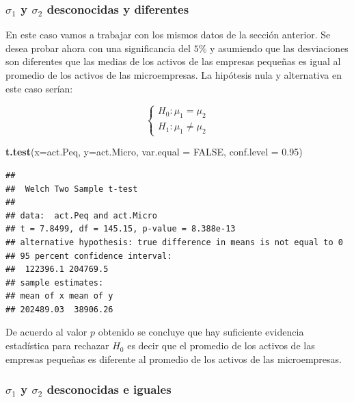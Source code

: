 \documentclass[letterpaper,]{book}
\newenvironment{Shaded}{\begin{snugshade}}{\end{snugshade}}
\newcommand{\DataTypeTok}[1]{\textcolor[rgb]{0.13,0.29,0.53}{#1}}
\newcommand{\FloatTok}[1]{\textcolor[rgb]{0.00,0.00,0.81}{#1}}
\newcommand{\KeywordTok}[1]{\textcolor[rgb]{0.13,0.29,0.53}{\textbf{#1}}}
\newcommand{\NormalTok}[1]{#1}
\newcommand{\OtherTok}[1]{\textcolor[rgb]{0.56,0.35,0.01}{#1}}
\begin{document}
\hypertarget{sigma_1-y-sigma_2-desconocidas-y-diferentes}{%
\subsubsection{\texorpdfstring{\(\sigma_1\) y \(\sigma_2\) desconocidas y diferentes}{\textbackslash{}sigma\_1 y \textbackslash{}sigma\_2 desconocidas y diferentes}}\label{sigma_1-y-sigma_2-desconocidas-y-diferentes}}

En este caso vamos a trabajar con los mismos datos de la sección anterior. Se desea probar ahora con una significancia del \(5\%\) y asumiendo que las desviaciones son diferentes que las medias de los activos de las empresas pequeñas es igual al promedio de los activos de las microempresas. La hipótesis nula y alternativa en este caso serían:

\begin{equation} 
\begin{cases} 
H_0: \mu_1 = \mu_2 \\ 
H_1: \mu_1 \neq \mu_2
\end{cases} 
\end{equation}

\begin{Shaded}
\begin{Highlighting}[]
\KeywordTok{t.test}\NormalTok{(}\DataTypeTok{x=}\NormalTok{act.Peq, }\DataTypeTok{y=}\NormalTok{act.Micro, }\DataTypeTok{var.equal =} \OtherTok{FALSE}\NormalTok{,}
       \DataTypeTok{conf.level =} \FloatTok{0.95}\NormalTok{)}
\end{Highlighting}
\end{Shaded}

\begin{verbatim}
## 
##  Welch Two Sample t-test
## 
## data:  act.Peq and act.Micro
## t = 7.8499, df = 145.15, p-value = 8.388e-13
## alternative hypothesis: true difference in means is not equal to 0
## 95 percent confidence interval:
##  122396.1 204769.5
## sample estimates:
## mean of x mean of y 
## 202489.03  38906.26
\end{verbatim}

De acuerdo al valor \(p\) obtenido se concluye que hay suficiente evidencia estadística para rechazar \(H_0\) es decir que el promedio de los activos de las empresas pequeñas es diferente al promedio de los activos de las microempresas.

\hypertarget{sigma_1-y-sigma_2-desconocidas-e-iguales}{%
\subsubsection{\texorpdfstring{\(\sigma_1\) y \(\sigma_2\) desconocidas e iguales}{\textbackslash{}sigma\_1 y \textbackslash{}sigma\_2 desconocidas e iguales}}\label{sigma_1-y-sigma_2-desconocidas-e-iguales}}
\end{document}
